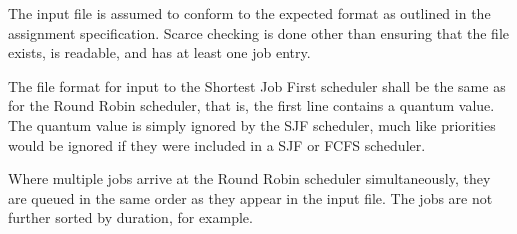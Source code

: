 \documentclass[a4paper,12pt]{article}
\begin{document}
The input file is assumed to conform to the expected format as outlined in the
assignment specification. Scarce checking is done other than ensuring that the
file exists, is readable, and has at least one job entry.

The file format for input to the Shortest Job First scheduler shall be the same
as for the Round Robin scheduler, that is, the first line contains a quantum
value. The quantum value is simply ignored by the SJF scheduler, much like
priorities would be ignored if they were included in a SJF or FCFS scheduler.

Where multiple jobs arrive at the Round Robin scheduler simultaneously, they
are queued in the same order as they appear in the input file. The jobs are not
further sorted by duration, for example.
\end{document}
